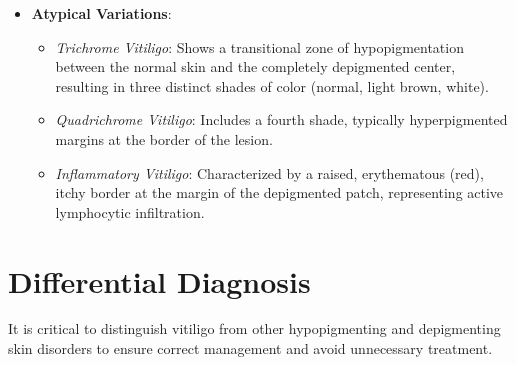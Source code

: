 \begin{itemize}
    \item \textbf{Atypical Variations}:
    \begin{itemize}
        \item \textit{Trichrome Vitiligo}: Shows a transitional zone of hypopigmentation between the normal skin and the completely depigmented center, resulting in three distinct shades of color (normal, light brown, white).
        \item \textit{Quadrichrome Vitiligo}: Includes a fourth shade, typically hyperpigmented margins at the border of the lesion.
        \item \textit{Inflammatory Vitiligo}: Characterized by a raised, erythematous (red), itchy border at the margin of the depigmented patch, representing active lymphocytic infiltration.
    \end{itemize}
\end{itemize}

\section*{Differential Diagnosis}
It is critical to distinguish vitiligo from other hypopigmenting and depigmenting skin disorders to ensure correct management and avoid unnecessary treatment.

